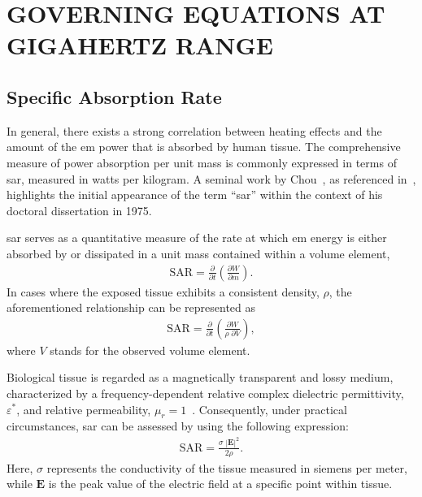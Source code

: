 \cleardoublepage

\chapter{GOVERNING EQUATIONS AT GIGAHERTZ RANGE}
\label{chap:3}

\section{Specific Absorption Rate}
In general, there exists a strong correlation between heating effects and the amount of the \gls{em} power that is absorbed by human tissue.
The comprehensive measure of power absorption per unit mass is commonly expressed in terms of \gls{sar}, measured in watts per kilogram.
A seminal work by Chou~\cite{Chou1975Effects}, as referenced in~\cite{Foster2022Three}, highlights the initial appearance of the term ``\gls{sar}'' within the context of his doctoral dissertation in 1975.

\Gls{sar} serves as a quantitative measure of the rate at which \gls{em} energy is either absorbed by or dissipated in a unit mass contained within a volume element,
\begin{align}
    \label{eqn:sar_1}
    \text{SAR} = \frac{\partial}{\partial t} \left( \frac{\partial W}{\partial m} \right).
\end{align}
In cases where the exposed tissue exhibits a consistent density, $\rho$, the aforementioned relationship can be represented as
\begin{align}
    \label{eqn:sar_2}
    \text{SAR} = \frac{\partial}{\partial t} \left( \frac{\partial W}{\rho \; \partial V} \right),
\end{align}
where $V$ stands for the observed volume element.

Biological tissue is regarded as a magnetically transparent and lossy medium, characterized by a frequency-dependent relative complex dielectric permittivity, $\varepsilon^*$, and relative permeability, $\mu_r = 1$~\cite{Sasaki2014Measurement}.
Consequently, under practical circumstances, \gls{sar} can be assessed by using the following expression:
\begin{align}
    \label{eqn:sar_3}
    \text{SAR} = \frac{\sigma \; \left| \mathbf{E} \right|^2}{2 \rho}.
\end{align}
Here, $\sigma$ represents the conductivity of the tissue measured in siemens per meter, while $\mathbf{E}$ is the peak value of the electric field at a specific point within tissue.

